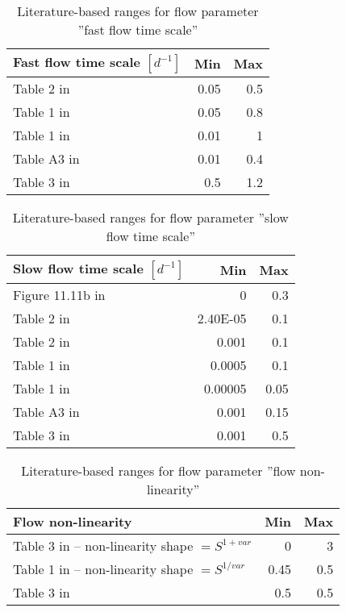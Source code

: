 \begin{table}[htbp]
  \centering
  \caption[References: Fast flow time scale]{Literature-based ranges for flow parameter ''fast flow time scale''}
    \begin{tabular}{lrr}
    \toprule
    \textbf{Fast flow time scale $[d^{-1}]$} & \textbf{Min} & \textbf{Max} \\
    \midrule
    Table 2 in \cite{Seibert1997} & 0.05  & 0.5 \\
    Table 1 in \cite{Rusli2015} & 0.05  & 0.8 \\
    Table 1 in \cite{Kollat2012} & 0.01  & 1 \\
    Table A3 in \cite{Seibert2012} & 0.01  & 0.4 \\
    Table 3 in \cite{Sun2015} & 0.5   & 1.2 \\
    \bottomrule
    \end{tabular}%
  \label{tab:sm4_kf}%
\end{table}%

\begin{table}[htbp]
  \centering
  \caption[References: Slow flow time scale]{Literature-based ranges for flow parameter ''slow flow time scale''}
    \begin{tabular}{lrr}
    \toprule
    \textbf{Slow flow time scale $[d^{-1}]$} & \textbf{Min} & \textbf{Max} \\
    \midrule
    Figure 11.11b in \cite{Chiew2002} & 0     & 0.3 \\
    Table 2 in \cite{Son2007} & 2.40E-05 & 0.1 \\
    Table 2 in \cite{Seibert1997} & 0.001 & 0.1 \\
    Table 1 in \cite{Rusli2015} & 0.0005 & 0.1 \\
    Table 1 in \cite{Kollat2012} & 0.00005 & 0.05 \\
    Table A3 in \cite{Seibert2012} & 0.001 & 0.15 \\
    Table 3 in \cite{Sun2015} & 0.001 & 0.5 \\
    \bottomrule
    \end{tabular}%
  \label{tab:sm4_ks}%
\end{table}%

\begin{table}[htbp]
  \centering
  \caption[References: Flow non-linearityy]{Literature-based ranges for flow parameter ''flow non-linearity''}
    \begin{tabular}{lrr}
    \toprule
    \textbf{Flow non-linearity} & \textbf{Min} & \textbf{Max} \\
    \midrule
    Table 3 in \cite{Liden2000} – non-linearity shape $= S^{1+var}$ & 0     & 3 \\
    Table 1 in \cite{Son2007} – non-linearity shape $= S^{1/var}$ & 0.45  & 0.5 \\
    Table 3 in \cite{Jothityangkoon2001} & 0.5   & 0.5 \\
    \bottomrule
    \end{tabular}%
  \label{tab:sm4_flownl}%
\end{table}%

